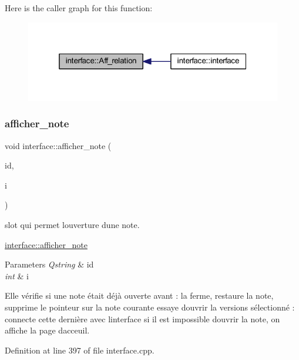 Here is the caller graph for this function\+:\nopagebreak
\begin{figure}[H]
\begin{center}
\leavevmode
\includegraphics[width=319pt]{classinterface_a287c8a46ece12a94540a190b96b911c9_icgraph}
\end{center}
\end{figure}
\mbox{\label{classinterface_a320051a7a36aa24f53b12df82649f15f}} 
\subsubsection{\texorpdfstring{afficher\+\_\+note}{afficher\_note}}
{\footnotesize\ttfamily void interface\+::afficher\+\_\+note (\begin{DoxyParamCaption}\item[{Q\+String}]{id,  }\item[{int}]{i }\end{DoxyParamCaption})\hspace{0.3cm}{\ttfamily [slot]}}



slot qui permet l\textquotesingle{}ouverture d\textquotesingle{}une note. 

\hyperlink{classinterface_a320051a7a36aa24f53b12df82649f15f}{interface\+::afficher\+\_\+note} 
\begin{DoxyParams}{Parameters}
{\em Qstring} & id \\
\hline
{\em int} & i\\
\hline
\end{DoxyParams}
Elle vérifie si une note était déjà ouverte avant \+: la ferme, restaure la note, supprime le pointeur sur la note courante essaye d\textquotesingle{}ouvrir la versions sélectionné \+: connecte cette dernière avec l\textquotesingle{}interface si il est impossible d\textquotesingle{}ouvrir la note, on affiche la page d\textquotesingle{}acceuil. 

Definition at line 397 of file interface.\+cpp.

